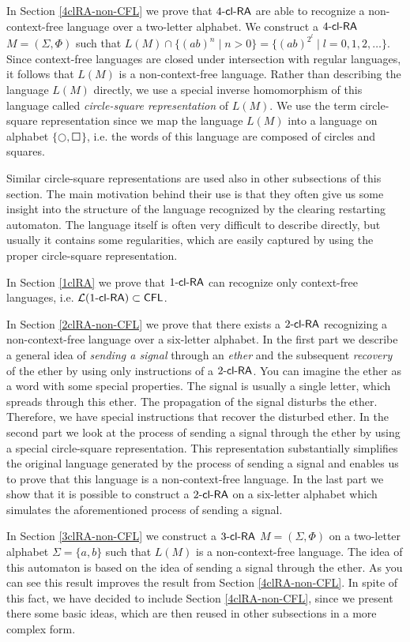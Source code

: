 In Section \ref{4clRA-non-CFL} we prove that $\kclRA[4]$ are able to recognize a non-context-free language over a two-letter alphabet. We construct a $\kclRA[4]$ $M = (\Sigma, \Phi)$ such that $L(M) \cap \{(ab)^n \mid n > 0\} = \{(ab)^{2^l} \mid l = 0, 1, 2, \ldots\}$. Since context-free languages are closed under intersection with regular languages, it follows that $L(M)$ is a non-context-free language. Rather than describing the language $L(M)$ directly, we use a special inverse homomorphism of this language called \emph{circle-square representation} of $L(M)$. We use the term circle-square representation since we map the language $L(M)$ into a language on alphabet $\{ \Circle, \Square \}$, i.e. the words of this language are composed of circles and squares.

Similar circle-square representations are used also in other subsections of this section. The main motivation behind their use is that they often give us some insight into the structure of the language recognized by the clearing restarting automaton. The language itself is often very difficult to describe directly, but usually it contains some regularities, which are easily captured by using the proper circle-square representation.

In Section \ref{1clRA} we prove that $\kclRA[1]$ can recognize only context-free languages, i.e. $\calL{\kclRA[1]} \subset \CFL$.

In Section \ref{2clRA-non-CFL} we prove that there exists a $\kclRA[2]$ recognizing a non-context-free language over a six-letter alphabet. In the first part we describe a general idea of \emph{sending a signal} through an \emph{ether} and the subsequent \emph{recovery} of the ether by using only instructions of a $\kclRA[2]$. You can imagine the ether as a word with some special properties. The signal is usually a single letter, which spreads through this ether. The propagation of the signal disturbs the ether. Therefore, we have special instructions that recover the disturbed ether. In the second part we look at the process of sending a signal through the ether by using a special circle-square representation. This representation substantially simplifies the original language generated by the process of sending a signal and enables us to prove that this language is a non-context-free language. In the last part we show that it is possible to construct a $\kclRA[2]$ on a six-letter alphabet which simulates the aforementioned process of sending a signal.

In Section \ref{3clRA-non-CFL} we construct a $\kclRA[3]$ $M = (\Sigma, \Phi)$ on a two-letter alphabet $\Sigma = \{a, b\}$ such that $L(M)$ is a non-context-free language. The idea of this automaton is based on the idea of sending a signal through the ether. As you can see this result improves the result from Section \ref{4clRA-non-CFL}. In spite of this fact, we have decided to include Section \ref{4clRA-non-CFL}, since we present there some basic ideas, which are then reused in other subsections in a more complex form.


